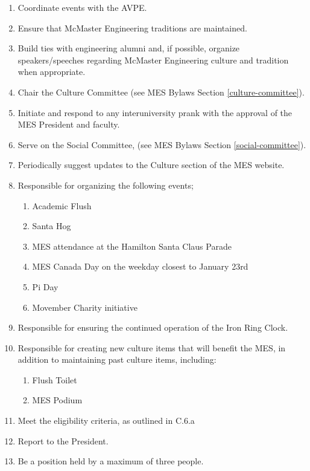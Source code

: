 \begin{enumerate}
 \item
  Coordinate events with the AVPE.
 \item
  Ensure that McMaster Engineering traditions are maintained.
 \item
  Build ties with engineering alumni and, if possible, organize
  speakers/speeches regarding McMaster Engineering culture and tradition
  when appropriate.
 \item
  Chair the Culture Committee (see MES Bylaws Section
  \ref{culture-committee}).
 \item
  Initiate and respond to any interuniversity prank with the approval of
  the MES President and faculty.
 \item
  Serve on the Social Committee, (see MES Bylaws Section
  \ref{social-committee}).
 \item
  Periodically suggest updates to the Culture section of the MES
  website.
 \item
  Responsible for organizing the following events;

  \begin{enumerate}
   \item
    Academic Flush
   \item
    Santa Hog
   \item
    MES attendance at the Hamilton Santa Claus Parade
   \item
    MES Canada Day on the weekday closest to January 23rd
   \item
    Pi Day
   \item
    Movember Charity initiative
  \end{enumerate}
 \item
  Responsible for ensuring the continued operation of the Iron Ring
  Clock.
 \item
  Responsible for creating new culture items that will benefit the MES,
  in addition to maintaining past culture items, including:

  \begin{enumerate}
   \item
    Flush Toilet
   \item
    MES Podium
  \end{enumerate}
 \item
  Meet the eligibility criteria, as outlined in C.6.a %
 \item
  Report to the President.
 \item
  Be a position held by a maximum of three people.

\end{enumerate}
